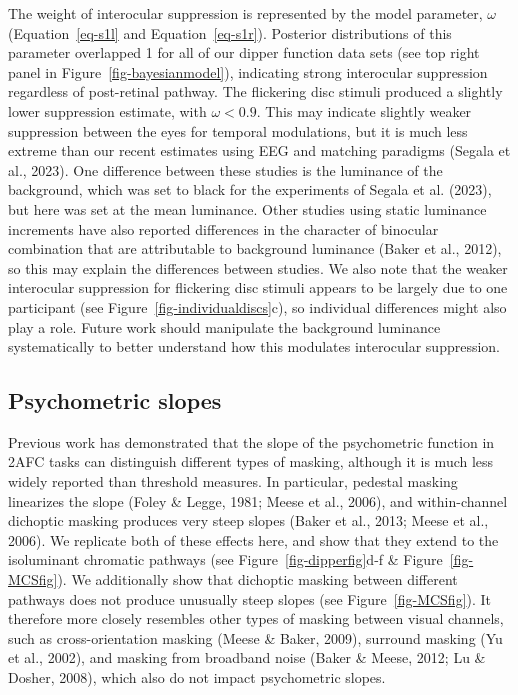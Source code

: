 \documentclass[
  letterpaper,
  DIV=11,
  numbers=noendperiod]{scrartcl}
\begin{document}
The weight of interocular suppression is represented by the model
parameter, \(\omega\) (Equation~\ref{eq-s1l} and Equation~\ref{eq-s1r}).
Posterior distributions of this parameter overlapped 1 for all of our
dipper function data sets (see top right panel in
Figure~\ref{fig-bayesianmodel}), indicating strong interocular
suppression regardless of post-retinal pathway. The flickering disc
stimuli produced a slightly lower suppression estimate, with
\(\omega < 0.9\). This may indicate slightly weaker suppression between
the eyes for temporal modulations, but it is much less extreme than our
recent estimates using EEG and matching paradigms (Segala et al., 2023).
One difference between these studies is the luminance of the background,
which was set to black for the experiments of Segala et al. (2023), but
here was set at the mean luminance. Other studies using static luminance
increments have also reported differences in the character of binocular
combination that are attributable to background luminance (Baker et al.,
2012), so this may explain the differences between studies. We also note
that the weaker interocular suppression for flickering disc stimuli
appears to be largely due to one participant (see
Figure~\ref{fig-individualdiscs}c), so individual differences might also
play a role. Future work should manipulate the background luminance
systematically to better understand how this modulates interocular
suppression.

\hypertarget{psychometric-slopes}{%
\subsection{Psychometric slopes}\label{psychometric-slopes}}

Previous work has demonstrated that the slope of the psychometric
function in 2AFC tasks can distinguish different types of masking,
although it is much less widely reported than threshold measures. In
particular, pedestal masking linearizes the slope (Foley \& Legge, 1981;
Meese et al., 2006), and within-channel dichoptic masking produces very
steep slopes (Baker et al., 2013; Meese et al., 2006). We replicate both
of these effects here, and show that they extend to the isoluminant
chromatic pathways (see Figure~\ref{fig-dipperfig}d-f \&
Figure~\ref{fig-MCSfig}). We additionally show that dichoptic masking
between different pathways does not produce unusually steep slopes (see
Figure~\ref{fig-MCSfig}). It therefore more closely resembles other
types of masking between visual channels, such as cross-orientation
masking (Meese \& Baker, 2009), surround masking (Yu et al., 2002), and
masking from broadband noise (Baker \& Meese, 2012; Lu \& Dosher, 2008),
which also do not impact psychometric slopes.
\end{document}
